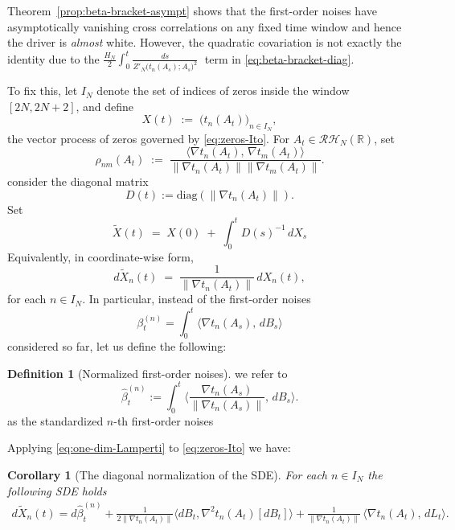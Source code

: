 \documentclass[12pt,reqno]{amsart}
\theoremstyle{plain}
\newtheorem{cor}[prop]{Corollary}
\theoremstyle{definition}
\newtheorem{dfn}{Definition}[section]   %
\theoremstyle{remark}
\begin{document}
Theorem~\ref{prop:beta-bracket-asympt} shows that the first-order noises have
asymptotically vanishing cross correlations on any fixed time window and hence the driver is \emph{almost} white. 
However, the quadratic covariation is not exactly the identity due to the $\frac{H_N}{2}\int_0^t \frac{ds}{Z'_N\!\bigl(t_n(A_s);A_s\bigr)^2}
\;$ term in \eqref{eq:beta-bracket-diag}. 

To fix this, let \(I_N\) denote the set of indices of zeros inside the window \([2N,2N+2]\), and define
\begin{equation}
X(t) \;:=\; \bigl(t_n(A_t)\bigr)_{n\in I_N},
\end{equation}
the vector process of zeros governed by \eqref{eq:zeros-Ito}. For \(A_t\in\mathcal{RH}_N(\mathbb{R})\), set
\begin{equation}
\rho_{nm}(A_t)\;:=\;\frac{\big\langle \nabla t_n(A_t),\,\nabla t_m(A_t) \big\rangle}{\big\|\nabla t_n(A_t) \big\|\big\|\nabla t_m(A_t) \big\|}.
\end{equation}
consider the diagonal matrix 
\begin{equation} D(t):=\mathrm{diag}(\big\|\nabla t_n(A_t) \big\|).
\end{equation}
Set
\begin{equation}\label{eq:def-Xtilde}
\widetilde X(t) \;=\;  X(0) \;+\; \int_0^t D(s)^{-1}\, dX_s 
\end{equation}
Equivalently, in coordinate-wise form,
\begin{equation}
\label{eq:one-dim-Lamperti}
d\widetilde X_n(t) \;=\; \frac{1}{\big\|\nabla t_n(A_t) \big\|}\, dX_n(t),
\end{equation}
for each \(n\in I_N\). In particular, instead of the first-order noises
\begin{equation}
\beta^{(n)}_t=\int_0^t\Big\langle \nabla t_n(A_s),\,dB_s\Big\rangle
\end{equation} considered so far, let us define the following: 

\begin{dfn}[Normalized first-order noises] we refer to  
\begin{equation}
\hat\beta^{(n)}_t:=\int_0^t\Big\langle \frac{\nabla t_n(A_s)}{\|\nabla t_n(A_s)\|},\,dB_s\Big\rangle .
\end{equation} 
as the standardized $n$-th first-order noises
\end{dfn}  Applying \eqref{eq:one-dim-Lamperti} to \eqref{eq:zeros-Ito} we have:
\begin{cor}[The diagonal normalization of the SDE]\label{prop:Xtilde-SDE-1} For each $n\in I_N$ the following SDE holds 
\begin{multline}\label{eq:Xtilde-SDE-1}
d\widetilde X_n(t)
= d\hat\beta^{(n)}_t+\frac{1}{2\big\|\nabla t_n(A_t) \big\|} \langle dB_t, \nabla^2 t_n(A_t)[dB_t] \rangle
+ \frac{1}{\big\|\nabla t_n(A_t) \big\|}\,\langle \nabla t_n(A_t) ,\,dL_t\rangle.
\end{multline}
\end{cor}
\end{document}

